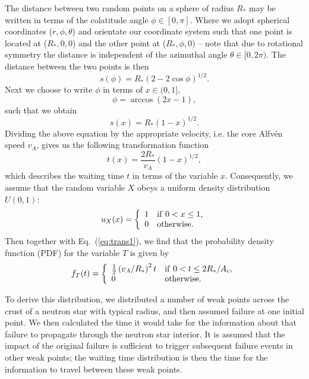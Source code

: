 \documentclass[12pt]{emulateapj}
\begin{document}
The distance between two random points on a sphere of radius $R_*$ may be written in terms of the colatitude angle $\phi\in[0,\pi]$. Where we adopt spherical coordinates ($r,\phi,\theta$) and orientate our coordinate system such that one point is located at ($R_*,0,0$) and the other point at ($R_*,\phi,0$) -- note that due to rotational symmetry the distance is independent of the azimuthal angle $\theta\in[0,2\pi)$. The distance between the two points is then
\begin{equation}\label{eq}
s(\phi)=R_*(2-2\cos\phi)^{1/2}.
\end{equation}
Next we choose to write $\phi$ in terms of $x\in(0,1]$,
\begin{equation}\label{eq:phi(x)}
\phi=\arccos(2x-1),
\end{equation}
such that we obtain
\begin{equation}\label{eq}
s(x)=R_*(1-x)^{1/2}.
\end{equation}
Dividing the above equation by the appropriate velocity, i.e. the core Alfv\'en speed  $v_A$, gives us the following transformation function
\begin{equation}\label{eq:trans1}
t(x)=\frac{2R_*}{v_A}(1-x)^{1/2},
\end{equation}
which describes the waiting time $t$ in terms of the variable $x$. Consequently, we assume that the random variable $X$ obeys a uniform density distribution $U(0,1)$:
\begin{equation}\label{eq:uniform dist}
u_X(x) = \left\{
\begin{array}{ll}
1 &  {\rm if~} 0<x\leq1,\\
0 & {\rm otherwise}.
\end{array} \right.
\end{equation}
Then together with Eq.~(\ref{eq:trans1}), we find that the probability density function (PDF) for the variable $T$ is given by
\begin{equation}\label{eq}
f_T(t) = \left\{
\begin{array}{ll}
\frac{1}{2}\left(v_A/R_*\right)^2t &  {\rm if~} 0<t\leq2R_*/A_c,\\
0 & {\rm otherwise}.
\end{array} \right.
\end{equation}

To derive this distribution, we distributed a number of weak points across the crust of a neutron star with typical radius, and then assumed failure at one initial point. We then calculated the time it would take for the information about that failure to propagate through the neutron star interior. It is assumed that the impact of the original failure is sufficient to trigger subsequent failure events in other weak points; the waiting time distribution is then the time for the information to travel between these weak points.
\end{document}
